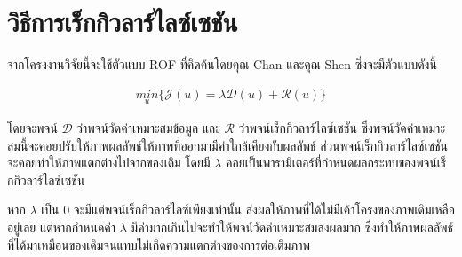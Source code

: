 \section{วิธีการเร็กกิวลาร์ไลซ์เซชัน}

\hspace{1cm} จากโครงงานวิจัยนี้จะใช้ตัวแบบ ROF ที่คิดค้นโดยคุณ Chan และคุณ Shen \cite{ref:rof-inpaint-chan-shen} ซึ่งจะมีตัวแบบดังนี้

\begin{align*}
    \underset{u}{{min}} \{ \mathcal{J}(u) = \lambda \mathcal{D}(u) + \mathcal{R}(u) \}
\end{align*}

\hspace{1cm} โดยจะพจน์ $\mathcal{D}$  ว่าพจน์วัดค่าเหมาะสมข้อมูล และ $\mathcal{R}$ ว่าพจน์เร็กกิวลาร์ไลซ์เซชัน ซึ่งพจน์วัดค่าเหมาะสมนี้จะคอยปรับให้ภาพผลลัพธ์ให้ภาพที่ออกมามีค่าใกล้เคียงกับผลลัพธ์ ส่วนพจน์เร็กกิวลาร์ไลซ์เซชันจะคอยทำให้ภาพแตกต่างไปจากของเดิม โดยมี $\lambda$ คอยเป็นพารามิเตอร์ที่กำหนดผลกระทบของพจน์เร็กกิวลาร์ไลซ์เซชัน

\hspace{1cm} หาก $\lambda$ เป็น 0 จะมีแต่พจน์เร็กกิวลาร์ไลซ์เพียงเท่านั้น ส่งผลให้ภาพที่ได้ไม่มีเค้าโครงของภาพเดิมเหลืออยู่เลย แต่หากกำหนดค่า $\lambda$  มีค่ามากเกินไปจะทำให้พจน์วัดค่าเหมาะสมส่งผลมาก ซึ่งทำให้ภาพผลลัพธ์ที่ได้มาเหมือนของเดิมจนแทบไม่เกิดความแตกต่างของการต่อเติมภาพ